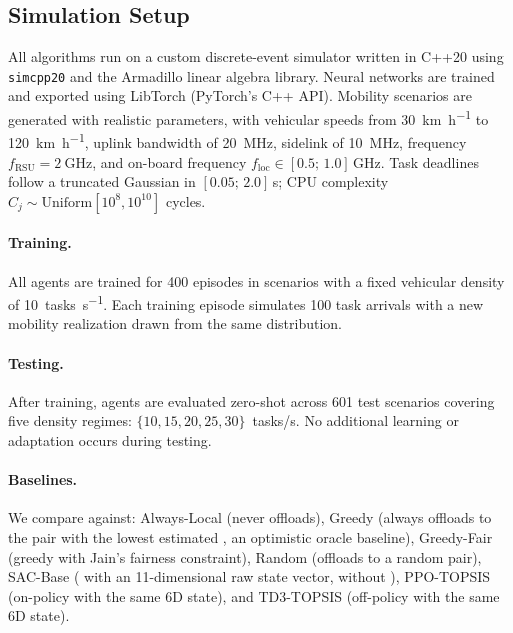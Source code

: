 \subsection{Simulation Setup}

All algorithms run on a custom discrete-event  simulator written in C++20 using \texttt{simcpp20} and the Armadillo linear algebra library. Neural networks are trained and exported using LibTorch (PyTorch's C++ API). Mobility scenarios are generated with realistic  parameters, with vehicular speeds from \SI{30}{\kilo\meter\per\hour} to \SI{120}{\kilo\meter\per\hour},  uplink bandwidth of \SI{20}{\mega\hertz},  sidelink of \SI{10}{\mega\hertz},  frequency $f_{\mathrm{RSU}} = \SI{2}{\giga\hertz}$, and on-board frequency $f_{\mathrm{loc}} \in [0.5;\, 1.0]$\,GHz. Task deadlines follow a truncated Gaussian in $[0.05;\, 2.0]$\,s; CPU complexity $C_j \sim \mathrm{Uniform}[10^8, 10^{10}]$ cycles.

\paragraph{Training.} All  agents are trained for 400 episodes in scenarios with a fixed vehicular density of \SI{10}{tasks\per\second}. Each training episode simulates 100 task arrivals with a new mobility realization drawn from the same distribution.

\paragraph{Testing.} After training, agents are evaluated zero-shot across 601 test scenarios covering five density regimes: $\{10, 15, 20, 25, 30\}$~tasks/s. No additional learning or adaptation occurs during testing.

\paragraph{Baselines.} We compare against: Always-Local (never offloads), Greedy (always offloads to the  pair with the lowest estimated , an optimistic oracle baseline), Greedy-Fair (greedy with Jain's fairness constraint), Random (offloads to a random pair), SAC-Base ( with an 11-dimensional raw state vector, without ), PPO-TOPSIS (on-policy  with the same 6D  state), and TD3-TOPSIS (off-policy  with the same 6D  state).

